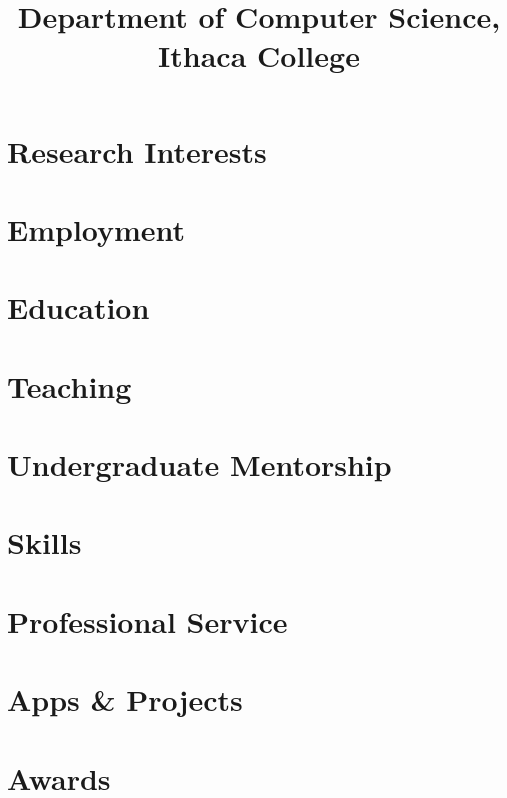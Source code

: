 \documentclass[11pt, letterpaper]{practical-cv}
\title{Department of Computer Science,\\Ithaca College}
\begin{document}
\makecvtitle

\section{Research Interests}


\section{Employment}


\section{Education}


\section{Teaching}


\section{Undergraduate Mentorship}


\printbibliography[title=Publications, nottype=misc]

\setlength\bibitemsep{0.5em}
\printbibliography[title=Talks, type=misc, resetnumbers=true]

\section{Skills}


\section{Professional Service}


\section{Apps \& Projects}


\section{Awards}

\end{document}
